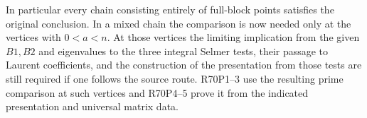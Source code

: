 In particular every chain consisting entirely of full-block points
satisfies the original conclusion. In a mixed chain the comparison
is now needed only at the vertices with $0<a<n$. At those vertices
the limiting implication from the given $B1,B2$ and eigenvalues to
the three integral Selmer tests, their passage to Laurent
coefficients, and the construction of the presentation from those
tests are still required if one follows the source route. R70P1--3
use the resulting prime comparison at such vertices and R70P4--5
prove it from the indicated presentation and universal matrix data.
